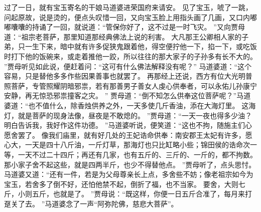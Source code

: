 \par
过了一日，就有宝玉寄名的干娘马道婆进荣国府来请安。
见了宝玉，唬了一跳，问起原故，说是烫的，便点头叹惜一回，又向宝玉脸上用指头画了几画，又口内嘟嘟囔囔的持诵了一回，就说道：“管保你好了，这不过是一时飞灾。
”又向贾母道：“祖宗老菩萨，那里知道那经典佛法上说的利害。
大凡那王公卿相人家的子弟，只一生下来，暗中就有许多促狭鬼跟着他，得空便拧他一下，掐一下，或吃饭时打下他的饭碗来，或走着推他一跤，所以往往的那大家子的子孙多有长不大的。
”贾母听见如此说，便赶着问：“这可有什么佛法解释没有呢？”
马道婆道：“这个容易，只是替他多多作些因果善事也就罢了。
再那经上还说，西方有位大光明普照菩萨，专管照耀阴暗邪祟，若有那善男子善女人虔心供奉者，可以永佑儿孙康宁安静，再无惊恐邪祟撞客之灾。
”
贾母道：“倒不知怎么供奉这位菩萨呢？”马道婆道：“也不值什么，除香烛供养之外，一天多使几斤香油，添在大海灯里。
这海灯，就是菩萨的现身法像，昼夜是不敢熄的。
”贾母道：“一天一夜也得多少油？明白告诉我，我好作这件功德。
”马道婆听说，便笑道：“这也不拘，随施主们心愿舍罢了。
像我们庙里，就有好几处的王妃诰命供奉：南安郡王太妃有许多，愿心大，一天是四十八斤油，一斤灯草，那海灯也只比缸略小些；锦田侯的诰命次一等，一天不过二十四斤；再还有几家，也有五斤的、三斤的、一斤的，都不拘数。
那小家子舍不起这些，就是四两半斤，也少不得替他点。
”贾母听了，点头思忖。
马道婆又道：“还有一件，若是为父母尊亲长上点，多舍些不妨；像老祖宗如今为宝玉，若舍多了倒不好，还怕他禁不起，倒折了福，也不当家。
要舍，大则七斤，小则五斤，也就是了。
”贾母说：“既这样，你便一日五斤合准了，每月来打趸关了去。
”马道婆念了一声“阿弥陀佛，慈悲大菩萨”。

